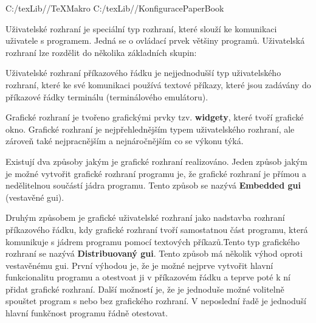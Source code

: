\def\ddr{C:/texLib/}

 \ddr/TeXMakro
\setAddress{\ddr}
 \ddr/KonfiguracePaperBook






Uživatelské rozhraní je speciální typ rozhraní, které slouží ke komunikaci uživatele s programem. Jedná se o ovládací prvek většiny programů. Uživatelská rozhraní lze rozdělit do několika základních skupin:

\vskip 4mm
\vskip 4mm



Uživatelské rozhraní příkazového řádku je nejjednodušší typ uživatelského rozhraní, které ke své komunikaci používá textové příkazy, které jsou zadávány do příkazové řádky terminálu (terminálového emulátoru). 





Grafické rozhraní je tvořeno grafickými prvky tzv. {\bf widgety}, které tvoří grafické okno. Grafické rozhraní je nejpřehlednějším typem uživatelského rozhraní, ale zároveň také nejpracnějším a nejnáročnějším co se výkonu týká. 

Existují dva způsoby jakým je grafické rozhraní realizováno. Jeden způsob jakým je možné vytvořit grafické rozhraní programu je, že grafické rozhraní je přímou a nedělitelnou součástí jádra programu. Tento způsob se nazývá {\bf Embedded gui} (vestavěné gui). 

Druhým způsobem je grafické uživatelské rozhraní jako nadstavba rozhraní příkazového řádku, kdy grafické rozhraní tvoří samostatnou část programu, která komunikuje s jádrem programu pomocí textových příkazů.Tento typ grafického rozhraní se nazývá {\bf Distribuovaný gui}. Tento způsob má několik výhod oproti vestavěnému gui. První výhodou je, že je možné nejprve vytvořit hlavní funkcionalitu programu a otestvoat ji v příkazovém řádku a teprve poté k ní přidat grafické rozhraní. Další možností je, že je jednoduše možné volitelně spouštet program s nebo bez grafického rozhraní. V neposlední řadě je jednoduší hlavní funkčnost programu řádně otestovat.


